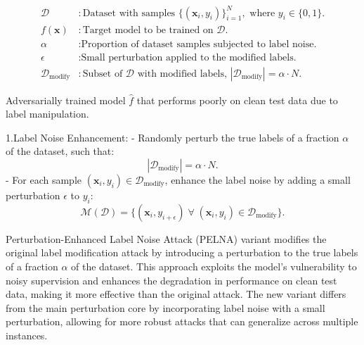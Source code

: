\[
\begin{aligned}
\mathcal{D} & : \text{Dataset with samples } \{(\mathbf{x}_i, y_i)\}_{i=1}^N, \text{ where } y_i \in \{0, 1\}. \\
f(\mathbf{x}) & : \text{Target model to be trained on } \mathcal{D}. \\
\alpha & : \text{Proportion of dataset samples subjected to label noise.} \\
\epsilon & : \text{Small perturbation applied to the modified labels.} \\
\mathcal{D}_{\text{modify}} & : \text{Subset of } \mathcal{D} \text{ with modified labels, } |\mathcal{D}_{\text{modify}}| = \alpha \cdot N.
\end{aligned}
\]

Adversarially trained model $\hat{f}$ that performs poorly on clean test data due to label manipulation.

1.Label Noise Enhancement:
   - Randomly perturb the true labels of a fraction $\alpha$ of the dataset, such that:
     \[
     |\mathcal{D}_{\text{modify}}| = \alpha \cdot N.
     \]
   - For each sample $(\mathbf{x}_i, y_i) \in \mathcal{D}_{\text{modify}}$, enhance the label noise by adding a small perturbation $\epsilon$ to $y_i$:
     \[
     \mathcal{M}(\mathcal{D}) = \{(\mathbf{x}_i, y_{i+\epsilon}) \; \forall \; (\mathbf{x}_i, y_i) \in \mathcal{D}_{\text{modify}}\}.
     \]

Perturbation-Enhanced Label Noise Attack (PELNA) variant modifies the original label modification attack by introducing a perturbation to the true labels of a fraction $\alpha$ of the dataset. This approach exploits the model's vulnerability to noisy supervision and enhances the degradation in performance on clean test data, making it more effective than the original attack. The new variant differs from the main perturbation core by incorporating label noise with a small perturbation, allowing for more robust attacks that can generalize across multiple instances.